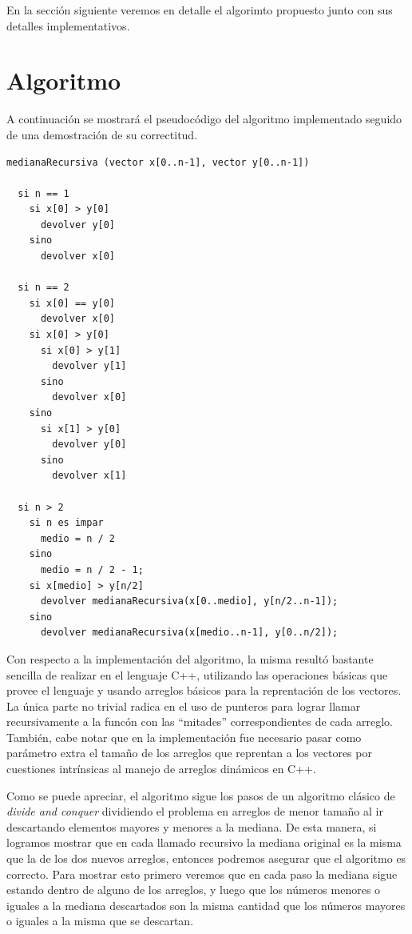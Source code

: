 \documentclass[a4paper,11pt] {article}
\begin{document}
En la sección siguiente veremos en detalle el algorimto propuesto junto con sus detalles implementativos.

\section*{Algoritmo}

A continuaci\'on se mostrar\'a el pseudoc\'odigo del algoritmo implementado seguido de una demostraci\'on de su correctitud.

\begin{verbatim}
medianaRecursiva (vector x[0..n-1], vector y[0..n-1])

  si n == 1
    si x[0] > y[0]
      devolver y[0]
    sino
      devolver x[0]

  si n == 2
    si x[0] == y[0]
      devolver x[0]
    si x[0] > y[0]
      si x[0] > y[1]
        devolver y[1]
      sino
        devolver x[0]
    sino
      si x[1] > y[0]
        devolver y[0]
      sino
        devolver x[1]

  si n > 2
    si n es impar
      medio = n / 2
    sino
      medio = n / 2 - 1;
    si x[medio] > y[n/2]
      devolver medianaRecursiva(x[0..medio], y[n/2..n-1]);
    sino
      devolver medianaRecursiva(x[medio..n-1], y[0..n/2]);
\end{verbatim}

Con respecto a la implementaci\'on del algoritmo, la misma result\'o bastante sencilla de realizar en el lenguaje C++, utilizando las operaciones b\'asicas que provee el lenguaje y usando arreglos b\'asicos para la reprentaci\'on de los vectores. La \'unica parte no trivial radica en el uso de punteros para lograr llamar recursivamente a la func\'on con las ``mitades'' correspondientes de cada arreglo. Tambi\'en, cabe notar que en la implementaci\'on fue necesario pasar como par\'ametro extra el tama\~{n}o de los arreglos que reprentan a los vectores por cuestiones intr\'insicas al manejo de arreglos din\'amicos en C++.

Como se puede apreciar, el algoritmo sigue los pasos de un algoritmo cl\'asico de \textit{divide and conquer} dividiendo el problema en arreglos de menor tama\~{n}o al ir descartando elementos mayores y menores a la mediana. De esta manera, si logramos mostrar que en cada llamado recursivo la mediana original es la misma que la de los dos nuevos arreglos, entonces podremos asegurar que el algoritmo es correcto. Para mostrar esto primero veremos que en cada paso la mediana sigue estando dentro de alguno de los arreglos, y luego que los n\'umeros menores o iguales a la mediana descartados son la misma cantidad que los n\'umeros mayores o iguales a la misma que se descartan.
\end{document}
